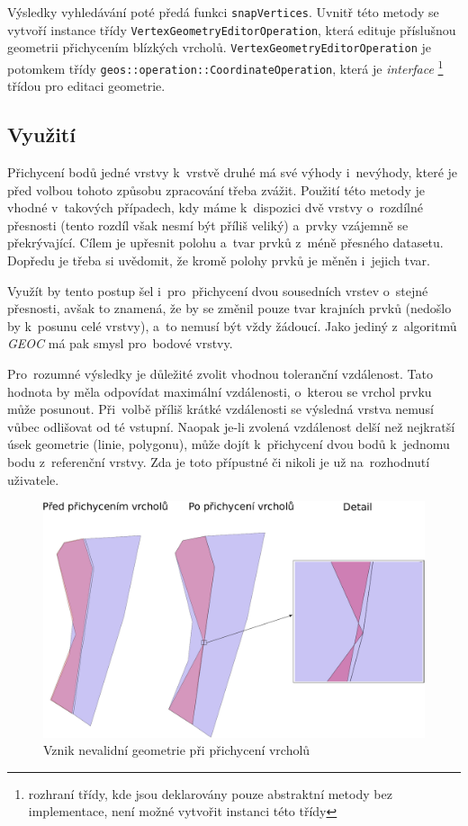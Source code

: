 Výsledky vyhledávání poté předá funkci \texttt{snap\-Vertices}. Uvnitř této
metody se vytvoří instance  třídy \texttt{Vertex\-Geometry\-Editor\-Operation},
která edituje příslušnou geometrii přichycením blízkých vrcholů.
\texttt{Vertex\-Geometry\-Editor\-Operation} je potomkem třídy 
\texttt{geos::\-operation::\-Coordinate\-Operation}, která je \textit{inter\-face}
\footnote{rozhraní třídy, kde jsou deklarovány pouze abstraktní metody bez
implementace, není možné vytvořit instanci této třídy} třídou pro editaci 
geometrie.


\subsection{Využití}
\label{vs-vyuziti}

Přichycení bodů jedné vrstvy k~vrstvě druhé má své výhody i~nevýhody, které 
je před volbou tohoto způsobu zpracování třeba zvážit. Použití této metody 
je vhodné v~takových případech, kdy máme k~dispozici dvě vrstvy o~rozdílné 
přesnosti (tento rozdíl však nesmí být příliš veliký) a~prvky vzájemně se 
překrývající. Cílem je upřesnit polohu a~tvar prvků z~méně přesného datasetu. 
Dopředu je třeba si uvědomit, že kromě polohy prvků je měněn i~jejich tvar.

Využít by tento postup šel i~pro~přichycení dvou sousedních vrstev o~stejné 
přesnosti, avšak to znamená, že by se změnil pouze tvar krajních prvků 
(nedošlo by k~posunu celé vrstvy), a~to nemusí být vždy žádoucí. Jako jediný
z~algoritmů \textit{GEOC} má pak smysl pro~bodové vrstvy.

Pro~rozumné výsledky je důležité zvolit vhodnou toleranční vzdálenost. Tato 
hodnota by měla odpovídat maximální vzdálenosti, o~kterou se vrchol prvku 
může posunout. Při~volbě příliš krátké vzdálenosti se výsledná vrstva nemusí 
vůbec odlišovat od té vstupní. Naopak \mbox{je-li} zvolená vzdálenost delší 
než nejkratší úsek geometrie (linie, polygonu), může dojít k~přichycení dvou 
bodů k~jednomu bodu z~referenční vrstvy. Zda je toto přípustné či nikoli je 
už na~rozhodnutí uživatele.

\label{vsinvalid}
  \begin{figure}[hbt]
    \centering
      \includegraphics[width=350pt]{./pictures/vs-invalid.pdf}
      \caption{Vznik nevalidní geometrie při přichycení vrcholů}
      \label{fig:vs-nevalidni}
  \end{figure} 

